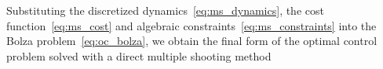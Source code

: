Substituting the discretized dynamics~\eqref{eq:ms_dynamics}, the cost function~\eqref{eq:ms_cost} and algebraic constraints~\eqref{eq:ms_constraints} into the Bolza problem~\eqref{eq:oc_bolza}, we obtain the final form of the optimal control problem solved with a direct multiple shooting method  
